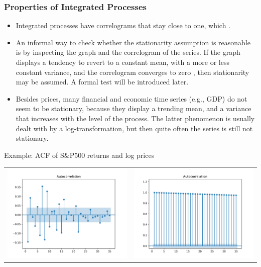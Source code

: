 \begin{frame}
\frametitle{Properties of Integrated Processes}
\begin{itemize}
\item  Integrated processes have correlograms that stay close to one, which .
\item An informal way to check whether the stationarity assumption is
reasonable is by inspecting the graph and the correlogram of the series. If
the graph displays a tendency to revert to a constant mean, with a
more or less constant variance, and the correlogram converges to zero
, then stationarity may be assumed. A formal test will be introduced later.
\item Besides prices, many financial and economic time series (e.g., GDP) do not seem to be stationary,
because they display a trending mean, and a variance that increases with the
level of the process. The latter phenomenon is usually dealt with by a
log-transformation, but then quite often the series is still not stationary.
\end{itemize}
\end{frame}
\begin{frame}
\begin{block}{Example: ACF of S\&P500 returns and log prices}
\begin{centering}
\begin{tabular}{cc}
\includegraphics[width=.45\textwidth]{sp500_acf}&
\includegraphics[width=.45\textwidth]{sp500_acf_levels}
\end{tabular}
\end{centering}
\end{block}
\end{frame}
